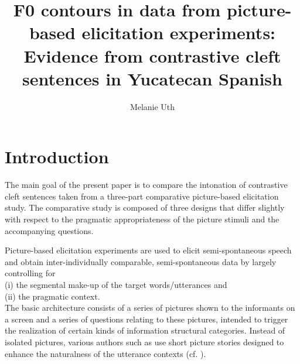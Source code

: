 \documentclass[output=paper]{langsci/langscibook}
\author{Melanie Uth\affiliation{Universität zu Köln}}
\title{F0 contours in data from picture-based elicitation experiments: Evidence from contrastive cleft sentences in Yucatecan Spanish}
\begin{document}
\label{chap:uth}

\section{Introduction} 
\label{sec:uth:1}
The main goal of the present paper is to compare the intonation of contrastive cleft sentences taken from a three-part comparative picture-based elicitation \linebreak study. The comparative study is composed of three designs that differ slightly with respect to the pragmatic appropriateness of the picture stimuli and the accompanying questions.

Picture-based elicitation experiments are used to elicit semi-spontaneous \linebreak speech and obtain inter-individually comparable, semi-spontaneous data by large\-ly controlling for \\
(i) the segmental make-up of the target words/utterances and \\
(ii) the pragmatic context. \\
The basic architecture consists of a series of pictures shown to the informants on a screen and a series of questions relating to these pictures, intended to trigger the realization of certain kinds of information structural categories. Instead of isolated pictures, various authors such as \citet{Gabriel2007,Gabriel2010article,Heidinger13,Heidinger14,Feldhausen2014} use short picture stories designed to enhance the naturalness of the utterance contexts (cf. ).
\end{document}
